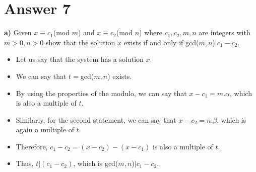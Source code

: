 \documentclass[12pt]{article}
\begin{document}
\section*{Answer 7}
\textbf{a)} Given $x \equiv c_1 $(mod $m$) and $x \equiv c_2 $(mod $n$) where $c_1, c_2, m, n$ are integers with $m > 0, n > 0$ show that the solution $x$ exists if and only if gcd($m,n$)$\vert c_1-c_2$.
\begin{itemize}
    \item Let us say that the system has a solution $x$. 
    \item We can say that $t=$gcd($m,n$) exists.
    \item By using the properties of the modulo, we can say that $x-c_1 = m . \alpha$, which is also a multiple of $t$.
    \item Similarly, for the second statement, we can say that $x-c_2 = n . \beta$, which is again a multiple of $t$.
    \item Therefore, $c_1-c_2 = (x-c_2)-(x-c_1)$ is also a multiple of $t$.
    \item Thus, $t \vert (c_1-c_2)$, which is gcd($m,n$)$\vert c_1-c_2$.
\end{itemize}
\end{document}
